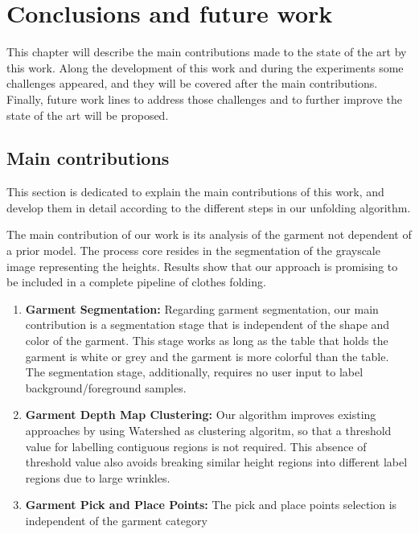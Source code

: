 \chapter{Conclusions and future work}
\label{conclusions_and_future_work}

This chapter will describe the main contributions made to the state of the art by this work. Along the development of this work and during the experiments some challenges appeared, and they will be covered after the main contributions. Finally, future work lines to address those challenges and to  further improve the state of the art will be proposed.


\section {Main contributions}
\label{conclusions:contributions}

This section is dedicated to explain the main contributions of this work, and develop them in detail according to the different steps in our unfolding algorithm.

The main contribution of our work is its analysis of the garment not dependent of a prior model. The process core resides in the segmentation of the grayscale image representing the heights. Results show that our approach is promising to be included in a complete pipeline of clothes folding.

\begin{enumerate}
	\item \textbf{Garment Segmentation:} Regarding garment segmentation, our main contribution is a segmentation stage that is independent of the shape and color of the garment. This stage works as long as the table that holds the garment is white or grey and the garment is more colorful than the table. The segmentation stage, additionally, requires no user input to label background/foreground samples.
	\item \textbf{Garment Depth Map Clustering:} Our algorithm improves existing approaches by using Watershed as clustering algoritm, so that a threshold value for labelling contiguous regions is not required. This absence of threshold value also avoids breaking similar height regions into different label regions due to large wrinkles. 
	\item \textbf{Garment Pick and Place Points:} The pick and place points selection is independent of the garment category \comment{[...]}
\end{enumerate}

